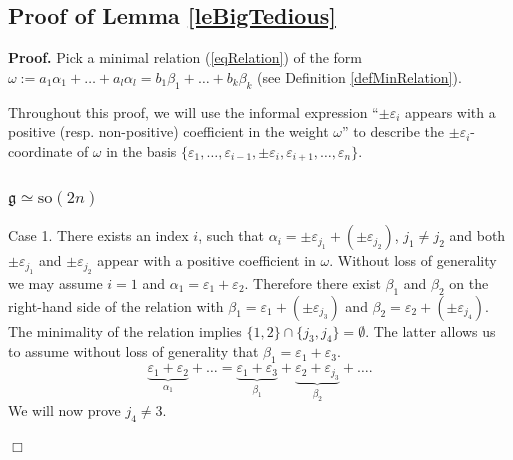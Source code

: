 \documentclass[12pt]{report}
\newenvironment{proof}[1][]{ \textbf{Proof#1. }}{$\Box$\medskip}
\newcommand{\gG}{\mathfrak{g}}
\newcommand{\refle}[1]{Lemma \ref{#1}}
\newcommand{\refeq}[1]{(\ref{#1})}
\newcommand{\so}{\mathrm{so}}
\newcommand{\eps}{\varepsilon}
\newcommand{\pmf}[1]{ \pm}%
\begin{document}
\subsection{Proof of \refle{leBigTedious}} \label{secBigTediousProof}

\begin{proof}Pick a minimal relation \refeq{eqRelation} of the form $\omega:=a_1\alpha_1+\dots+a_l\alpha_l=b_1\beta_1+\dots+b_k\beta_k$ (see Definition \ref{defMinRelation}).

Throughout this proof, we will use the informal expression ``$\pm\eps_{i}$ appears with a positive (resp. non-positive) coefficient in the weight $\omega$'' to describe the $\pm\eps_i$-coordinate of $\omega$ in the basis $\{\eps_1,\dots, \eps_{i-1},\pmf{i}\eps_i, \eps_{i+1}, \dots, \eps_n\}$. 

\subsubsection{$\gG\simeq\so(2n)$}
\smallskip\noindent Case 1. There exists an index $i$, such that $\alpha_i =\pmf{j_1} \eps_{j_1} +(\pmf{j_2} \eps_{j_2})$, $j_1\neq j_2$ and both $\pmf{j_1} \eps_{j_1}$ and $\pmf{j_2}\eps_{j_2}$ appear with a positive coefficient in $\omega$. Without loss of generality we may assume $i=1$ and $\alpha_1= \eps_{1}+\eps_{2}$. Therefore there exist $\beta_{1}$ and $\beta_{2}$ on the right-hand side of the relation with $\beta_1= \eps_{1} +(\pmf{j_3}\eps_{j_3})$ and $\beta_2=\eps_{2}+(\pmf{j_4} \eps_{j_4})$. The minimality of the relation implies $\{1, 2\}\cap\{j_3,j_4\}=\emptyset $. The latter allows us to assume without loss of generality that $\beta_1= \eps_{1} +\eps_{3}$.
\[
\underbrace{\eps_{1}+\eps_{2}}_{\alpha_1}+\dots= \underbrace{\eps_{1}+\eps_{3}}_{\beta_1}+\underbrace{ \eps_{2} +\eps_{j_3}}_{\beta_2}+\dots .
\]
We will now prove $j_4\neq 3$. 


\end{proof}
\end{document}
